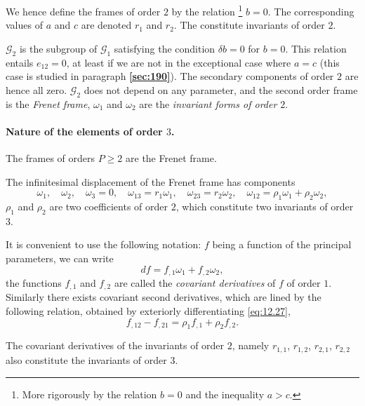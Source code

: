 \documentclass[leqno,11pt]{book}
\numberwithin{equation}{chapter}
\theoremstyle{shape1}
\theoremstyle{shapesmall}
\newcommand{\fsref}[1]{{\rm\textsection\textbf{\ref{sec:#1}}}}
\begin{document}
We hence define the frames of order $2$ by the relation \footnote{More rigorously by the relation $b=0$ and the inequality $a>c$.} $b=0$. The corresponding values of $a$ and $c$ are denoted $r_{1}$ and $r_{2}$. The constitute invariants of order $2$.

$\mathcal{G}_{2}$ is the subgroup of $\mathcal{G}_{1}$ satisfying the condition $\delta b=0$ for $b=0$. This relation entails $e_{12}=0$, at least if we are not in the exceptional case where $a=c$ (this case is studied in paragraph \fsref{190}). The secondary components of order $2$ are hence all zero. $\mathcal{G}_{2}$ does not depend on any parameter, and the second order frame is the \emph{Frenet frame}, $\omega_{1}$ and $\omega_{2}$ are the \emph{invariant forms of order $2$}.


\paragraph{Nature of the elements of order $3$.}
\label{sec:188}
The frames of orders $P\ge 2$ are the Frenet frame.

The infinitesimal displacement of the Frenet frame has components
\begin{equation}
  \label{eq:12.26}
  \omega_{1},\quad\omega_{2},\quad\omega_{3}=0,\quad\omega_{13}=r_{1}\omega_{1},\quad\omega_{23}=r_{2}\omega_{2},\quad\omega_{12}=\rho_{1}\omega_{1}+\rho_{2}\omega_{2},
\end{equation}
$\rho_{1}$ and $\rho_{2}$ are two coefficients of order $2$, which constitute two invariants of order $3$.

It is convenient to use the following notation: $f$ being a function of the principal parameters, we can write
\begin{equation}
  \label{eq:12.27}
  df=f_{,1}\omega_{1}+f_{,2}\omega_{2},
\end{equation}
the functions $f_{,1}$ and $f_{,2}$ are called the \emph{covariant derivatives} of $f$ of order $1$. Similarly there exists covariant second derivatives, which are lined by the following relation, obtained by exteriorly differentiating \eqref{eq:12.27},
\[
f_{,12}-f_{,21}=\rho_{1}f_{,1}+\rho_{2}f_{,2}.
\]

The covariant derivatives of the invariants of order $2$, namely $r_{1,1}$, $r_{1,2}$, $r_{2,1}$, $r_{2,2}$ also constitute the invariants of order $3$.
\end{document}
